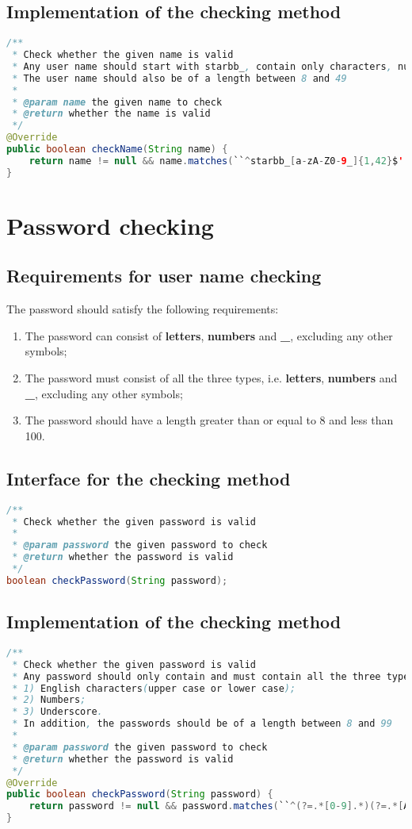 \documentclass[a4paper]{report}
\begin{document}
\subsection{Implementation of the checking method}
\begin{lstlisting}[language=java]
/**
 * Check whether the given name is valid
 * Any user name should start with starbb_, contain only characters, numbers and underscore
 * The user name should also be of a length between 8 and 49
 *
 * @param name the given name to check
 * @return whether the name is valid
 */
@Override
public boolean checkName(String name) {
    return name != null && name.matches(``^starbb_[a-zA-Z0-9_]{1,42}$'');
}
\end{lstlisting}
\section{Password checking}
\subsection{Requirements for user name checking}
The password should satisfy the following requirements:
\begin{enumerate}
\item The password can consist of \textbf{letters}, \textbf{numbers} and \textbf{\_}, excluding any other symbols;
\item The password must consist of all the three types, i.e. \textbf{letters}, \textbf{numbers} and \textbf{\_}, excluding any other symbols;
\item The password should have a length greater than or equal to 8 and less than 100.
\end{enumerate}
\subsection{Interface for the checking method}
\begin{lstlisting}[language=java]
/**
 * Check whether the given password is valid
 *
 * @param password the given password to check
 * @return whether the password is valid
 */
boolean checkPassword(String password);
\end{lstlisting}
\subsection{Implementation of the checking method}
\begin{lstlisting}[language=java]
/**
 * Check whether the given password is valid
 * Any password should only contain and must contain all the three types of characters below:
 * 1) English characters(upper case or lower case);
 * 2) Numbers;
 * 3) Underscore.
 * In addition, the passwords should be of a length between 8 and 99
 *
 * @param password the given password to check
 * @return whether the password is valid
 */
@Override
public boolean checkPassword(String password) {
    return password != null && password.matches(``^(?=.*[0-9].*)(?=.*[A-Za-z].*)(?=.*[_].*)[a-zA-Z0-9_]{8,99}$'');
}
\end{lstlisting}
\end{document}
